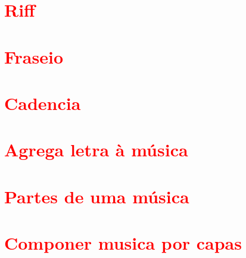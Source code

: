 \section{\textcolor{red}{Riff}}

\section{\textcolor{red}{Fraseio}}


\section{\textcolor{red}{Cadencia}}

\cite[pp. 111]{holst1998abc}



\section{\textcolor{red}{Agrega letra à música}}

\cite[pp. 149]{medteoria}


\section{\textcolor{red}{Partes de uma música}}

\section{\textcolor{red}{Componer musica por capas}}


